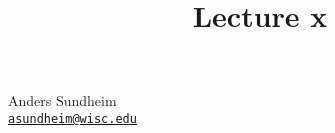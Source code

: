 \documentclass[12pt]{article}
\title{Lecture x}
\begin{document}
\maketitle
\vspace*{-0.25in}
\begin{center}
	Anders Sundheim \\
	\href{mailto:asundheim@wisc.edu}{{\tt asundheim@wisc.edu}}
\end{center}
\section*{}
\subsection*{}
\end{document}
